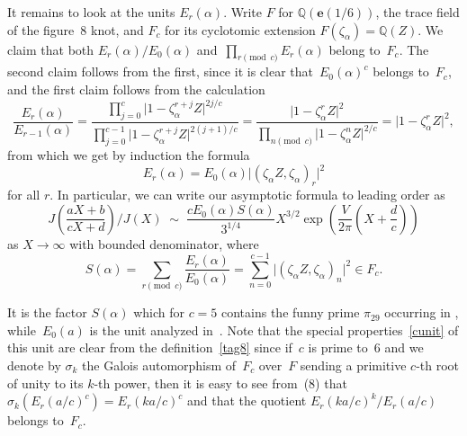 \documentclass[pdftex]{sigma}
\numberwithin{equation}{section}
\def\z{\zeta}
\def\e{\mathbf{e}}
\def\a{\alpha}
\def\Q{\mathbb Q}
\def\m{ - }
\def\si{\;\sim\;}
\def\e{\mathbf{e}}
\def\a{\alpha}
\def\z{\zeta}
\def\s{\sigma}
\def\J{\mathbf J} \def\J{J} %
\begin{document}
It remains to look at the units $E_r(\a)$. Write $F$ for $\Q(\e(1/6))$,
the trace field of the figure~8 knot, and $F_c$ for its cyclotomic
extension $F(\z_\a)=\Q(Z)$. We claim that both $E_r(\a)/E_0(\a)$ and~$\prod_{r\!\!\pmod c}E_r(\a)$ belong to~$F_c$. The second claim follows from
the first, since it is clear that~$E_0(\a)^c$ belongs to~$F_c$, and
the first claim follows from the calculation
\[
\frac{E_r(\a)}{E_{r-1}(\a)}
 = \frac{\prod_{j=0}^c \bigl|1-\z_\a^{r+j}Z\bigr|^{2j/c}}{\prod_{j=0}^{c-1}
\bigl|1-\z_\a^{r+j}Z\bigr|^{2(j+1)/c}}
 = \frac{\bigl|1-\z_\a^rZ\bigr|^2}{\prod_{n\!\!\!\!\pmod c} \bigl|1-\z_\a^nZ
\bigr|^{2/c}} = |1\m\z_\a^rZ\bigr|^2 ,
\]
from which we get by induction the formula
\[
E_r(\a) = E_0(\a) \bigl|(\z_\a Z,\z_\a)_r\bigr|^2
\]
for all $r$. In particular, we can write our asymptotic formula to
leading order as
\[%
\J\left(\frac{aX+b}{cX+d}\right)\Bigr/ \J(X) \si
\frac{c E_0(\a) S(\a)}{3^{1/4}}
 X^{3/2} \exp\left(\frac V{2\pi} \left(X+\frac dc\right)\right)
\]
as $X\to\infty$ with bounded denominator, where
\begin{equation}
\label{tag10}
S(\a) = \sum_{r\!\!\!\!\pmod c}\frac{E_r(\a)}{E_0(\a)} =
\sum_{n=0}^{c-1} \bigl|(\z_\a Z,\z_\a)_n\bigr|^2 \in F_c .
\end{equation}

It is the factor $S(\a)$ which for $c=5$ contains the funny prime $\pi_{29}$
occurring in \cite[p.\ 14]{Za:QMF}, while~$E_0(a)$ is the unit
analyzed in~\cite{CGZ}. Note that the special properties~\eqref{cunit}
of this unit are clear from the definition~\eqref{tag8}
since if~$c$ is prime to~$6$ and we denote by $\s_k$ the Galois automorphism
of~$F_c$ over~$F$ sending a primitive $c$-th root of unity to its $k$-th
power, then it is easy to see from~(8) that $\s_k(E_r(a/c)^c)=E_r(ka/c)^c$
and that the quotient $E_r(ka/c)^k/E_r(a/c)$ belongs to~$F_c$.
\end{document}
